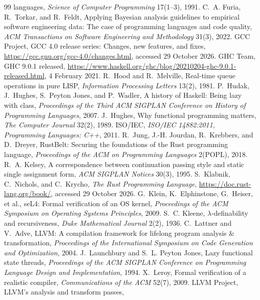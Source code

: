 \documentclass[11pt]{article}
\theoremstyle{definition}
\theoremstyle{remark}
\begin{document}
\begin{thebibliography}{99}
  languages, \emph{Science of Computer Programming} 17(1--3), 1991.
   C.~A. Furia, R.~Torkar, and R.~Feldt, Applying Bayesian
  analysis guidelines to empirical software engineering data: The case of
  programming languages and code quality, \emph{ACM Transactions on
  Software Engineering and Methodology} 31(3), 2022.
   GCC Project, GCC 4.0 release series: Changes, new
  features, and fixes, \url{https://gcc.gnu.org/gcc-4.0/changes.html},
  accessed 29 October 2026.
   GHC Team, GHC 9.0.1 released,
  \url{https://www.haskell.org/ghc/blog/20210204-ghc-9.0.1-released.html},
  4 February 2021.
   R.~Hood and R.~Melville, Real-time queue operations in
  pure LISP, \emph{Information Processing Letters} 13(2), 1981.
   P.~Hudak, J.~Hughes, S.~Peyton Jones, and P.~Wadler, A
  history of Haskell: Being lazy with class, \emph{Proceedings of the Third
  ACM SIGPLAN Conference on History of Programming Languages}, 2007.
   J.~Hughes, Why functional programming matters, \emph{The
  Computer Journal} 32(2), 1989.
   ISO/IEC, \emph{ISO/IEC 14882:2011, Programming
  Languages: C++}, 2011.
   R.~Jung, J.-H. Jourdan, R.~Krebbers, and D.~Dreyer,
  RustBelt: Securing the foundations of the Rust programming language,
  \emph{Proceedings of the ACM on Programming Languages} 2(POPL), 2018.
   R.~A. Kelsey, A correspondence between continuation
  passing style and static single assignment form, \emph{ACM SIGPLAN
  Notices} 30(3), 1995.
   S.~Klabnik, C.~Nichols, and C.~Krycho, \emph{The Rust
  Programming Language}, \url{https://doc.rust-lang.org/book/}, accessed
  29 October 2026.
   G.~Klein, K.~Elphinstone, G.~Heiser, et al., seL4: Formal
  verification of an OS kernel, \emph{Proceedings of the ACM Symposium on
  Operating Systems Principles}, 2009.
   S.~C. Kleene, $\lambda$-definability and recursiveness,
  \emph{Duke Mathematical Journal} 2(2), 1936.
   C.~Lattner and V.~Adve, LLVM: A compilation framework for
  lifelong program analysis \& transformation, \emph{Proceedings of the
  International Symposium on Code Generation and Optimization}, 2004.
   J.~Launchbury and S.~L. Peyton Jones, Lazy functional state
  threads, \emph{Proceedings of the ACM SIGPLAN Conference on Programming
  Language Design and Implementation}, 1994.
   X.~Leroy, Formal verification of a realistic compiler,
  \emph{Communications of the ACM} 52(7), 2009.
   LLVM Project, LLVM's analysis and transform passes,

\end{thebibliography}
\end{document}
